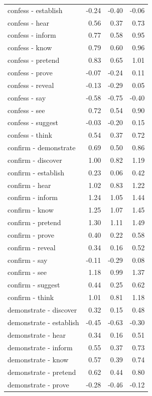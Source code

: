 \begin{longtable}{lrrr}
  confess - establish & -0.24 & -0.40 & -0.06 \\ 
  confess - hear & 0.56 & 0.37 & 0.73 \\ 
  confess - inform & 0.77 & 0.58 & 0.95 \\ 
  confess - know & 0.79 & 0.60 & 0.96 \\ 
  confess - pretend & 0.83 & 0.65 & 1.01 \\ 
  confess - prove & -0.07 & -0.24 & 0.11 \\ 
  confess - reveal & -0.13 & -0.29 & 0.05 \\ 
  confess - say & -0.58 & -0.75 & -0.40 \\ 
  confess - see & 0.72 & 0.54 & 0.90 \\ 
  confess - suggest & -0.03 & -0.20 & 0.15 \\ 
  confess - think & 0.54 & 0.37 & 0.72 \\ 
  confirm - demonstrate & 0.69 & 0.50 & 0.86 \\ 
  confirm - discover & 1.00 & 0.82 & 1.19 \\ 
  confirm - establish & 0.23 & 0.06 & 0.42 \\ 
  confirm - hear & 1.02 & 0.83 & 1.22 \\ 
  confirm - inform & 1.24 & 1.05 & 1.44 \\ 
  confirm - know & 1.25 & 1.07 & 1.45 \\ 
  confirm - pretend & 1.30 & 1.11 & 1.49 \\ 
  confirm - prove & 0.40 & 0.22 & 0.58 \\ 
  confirm - reveal & 0.34 & 0.16 & 0.52 \\ 
  confirm - say & -0.11 & -0.29 & 0.08 \\ 
  confirm - see & 1.18 & 0.99 & 1.37 \\ 
  confirm - suggest & 0.44 & 0.25 & 0.62 \\ 
  confirm - think & 1.01 & 0.81 & 1.18 \\ 
  demonstrate - discover & 0.32 & 0.15 & 0.48 \\ 
  demonstrate - establish & -0.45 & -0.63 & -0.30 \\ 
  demonstrate - hear & 0.34 & 0.16 & 0.51 \\ 
  demonstrate - inform & 0.55 & 0.37 & 0.73 \\ 
  demonstrate - know & 0.57 & 0.39 & 0.74 \\ 
  demonstrate - pretend & 0.62 & 0.44 & 0.80 \\ 
  demonstrate - prove & -0.28 & -0.46 & -0.12 \\ 

\end{longtable}
